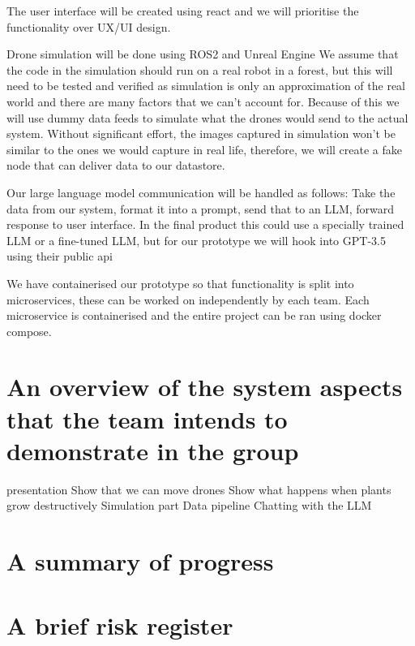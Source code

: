 \documentclass{article}
\begin{document}
The user interface will be created using react and we will prioritise the functionality over UX/UI design. 

Drone simulation will be done using ROS2 and Unreal Engine %
We assume that the code in the simulation should run on a real robot in a forest, but this will need to be tested and verified as simulation is only an approximation of the real world and there are many factors that we can't account for.
Because of this we will use dummy data feeds to simulate what the drones would send to the actual system.
Without significant effort, the images captured in simulation won't be similar to the ones we would capture in real life, therefore, we will create a fake node that can deliver data to our datastore.

Our large language model communication will be handled as follows: Take the data from our system, format it into a prompt, send that to an LLM, forward response to user interface.
In the final product this could use a specially trained LLM or a fine-tuned LLM, but for our prototype we will hook into GPT-3.5 using their public api %

We have containerised our prototype so that functionality is split into microservices, these can be worked on independently by each team.
Each microservice is containerised and the entire project can be ran using docker compose.

\section{An overview of the system aspects that the team intends to demonstrate in the group}
presentation
    Show that we can move drones
    Show what happens when plants grow destructively
        Simulation part
        Data pipeline 
    Chatting with the LLM


\section{A summary of progress}


\section{A brief risk register}
\end{document}
